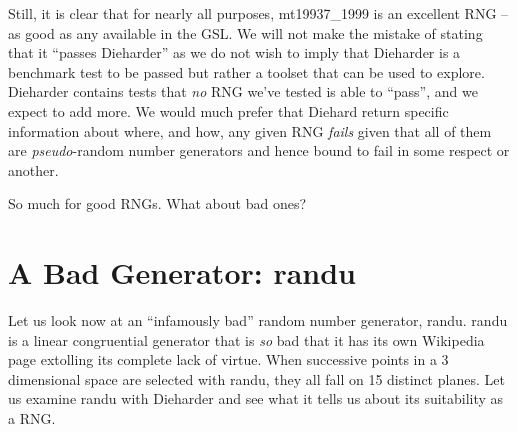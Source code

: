 \documentclass[12pt]{book}
\begin{document}
Still, it is clear that for nearly all purposes, mt19937\_1999 is an
excellent RNG -- as good as any available in the GSL.  We will not make
the mistake of stating that it ``passes Dieharder'' as we do not wish to
imply that Dieharder is a benchmark test to be passed but rather a
toolset that can be used to explore.  Dieharder contains tests that {\em
no} RNG we've tested is able to ``pass'', and we expect to add more.  We
would much prefer that Diehard return specific information about where,
and how, any given RNG {\em fails} given that all of them are {\em
pseudo}-random number generators and hence bound to fail in some respect
or another.

So much for good RNGs.  What about bad ones?

\section{A Bad Generator: randu}

Let us look now at an ``infamously bad'' random number generator, randu.
randu is a linear congruential generator that is {\em so} bad that it
has its own Wikipedia page\cite{wiki_randu} extolling its complete lack
of virtue.  When successive points in a 3 dimensional space are selected
with randu, they all fall on 15 distinct planes.  Let us examine randu
with Dieharder and see what it tells us about its suitability as a RNG.
\end{document}
